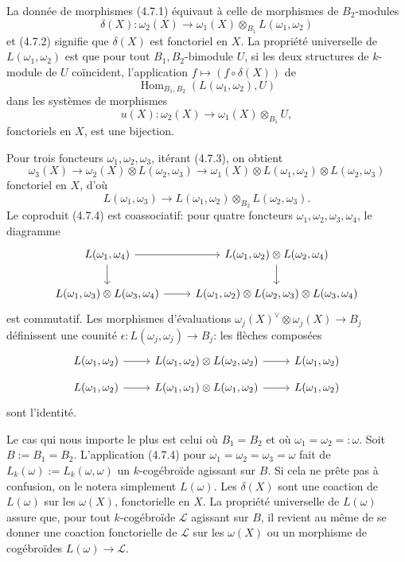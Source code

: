 \documentclass[12pt,a4paper]{article}
\theoremstyle{plain}
\theoremstyle{definition}
\theoremstyle{remark}
\DeclareMathOperator{\Hom}{Hom}
\begin{document}
La donnée de morphismes (4.7.1) équivaut à celle de morphismes de $B_2$-modules
\begin{equation}\label{eq:4.7.3}
\delta(X) : \omega_2(X) \to \omega_1(X) \otimes_{B_1} L(\omega_1,\omega_2)
\end{equation}
et (4.7.2) signifie que $\delta(X)$ est fonctoriel en $X$. La propriété universelle de $L(\omega_1,\omega_2)$ est que pour tout $B_1,B_2$-bimodule $U$, si les deux structures de $k$-module de $U$ coïncident, l'application $f \mapsto (f \circ \delta(X))$ de
\[
\Hom_{B_1,B_2}(L(\omega_1,\omega_2), U)
\]
dans les systèmes de morphismes
\[
u(X) : \omega_2(X) \to \omega_1(X) \otimes_{B_1} U,
\]
fonctoriels en $X$, est une bijection.

Pour trois foncteurs $\omega_1, \omega_2, \omega_3$, itérant (4.7.3), on obtient
\[
\omega_3(X) \to \omega_2(X) \otimes L(\omega_2,\omega_3) \to \omega_1(X) \otimes L(\omega_1,\omega_2) \otimes L(\omega_2,\omega_3)
\]
fonctoriel en $X$, d'où
\begin{equation}\label{eq:4.7.4}
L(\omega_1,\omega_3) \to L(\omega_1,\omega_2) \otimes_{B_2} L(\omega_2,\omega_3).
\end{equation}
Le coproduit (4.7.4) est coassociatif: pour quatre foncteurs $\omega_1, \omega_2, \omega_3, \omega_4$, le diagramme
\[
\begin{tikzcd}
L(\omega_1,\omega_4) \arrow[r] \arrow[d] & L(\omega_1,\omega_2) \otimes L(\omega_2,\omega_4) \arrow[d] \\
L(\omega_1,\omega_3) \otimes L(\omega_3,\omega_4) \arrow[r] & L(\omega_1,\omega_2) \otimes L(\omega_2,\omega_3) \otimes L(\omega_3,\omega_4)
\end{tikzcd}
\]
est commutatif. Les morphismes d'évaluations $\omega_j(X)^\vee \otimes \omega_j(X) \to B_j$ définissent une counité $\epsilon : L(\omega_j,\omega_j) \to B_j$: les flèches composées
\[
\begin{tikzcd}
L(\omega_1,\omega_2) \arrow[r] & L(\omega_1,\omega_2) \otimes L(\omega_2,\omega_2) \arrow[r] & L(\omega_1,\omega_2)
\end{tikzcd}
\]
\[
\begin{tikzcd}
L(\omega_1,\omega_2) \arrow[r] & L(\omega_1,\omega_1) \otimes L(\omega_1,\omega_2) \arrow[r] & L(\omega_1,\omega_2)
\end{tikzcd}
\]
sont l'identité.

Le cas qui nous importe le plus est celui où $B_1 = B_2$ et où $\omega_1 = \omega_2 =: \omega$.
Soit $B := B_1 = B_2$. L'application (4.7.4) pour $\omega_1 = \omega_2 = \omega_3 = \omega$ fait de $L_k(\omega) := L_k(\omega,\omega)$ un $k$-cogébroïde agissant sur $B$. Si cela ne prête pas à confusion, on le notera simplement $L(\omega)$. Les $\delta(X)$ sont une coaction de $L(\omega)$ sur les $\omega(X)$, fonctorielle en $X$. La propriété universelle de $L(\omega)$ assure que, pour tout $k$-cogébroïde $\mathcal{L}$ agissant sur $B$, il revient au même de se donner une coaction fonctorielle de $\mathcal{L}$ sur les $\omega(X)$ ou un morphisme de cogébroïdes $L(\omega) \to \mathcal{L}$.
\end{document}
